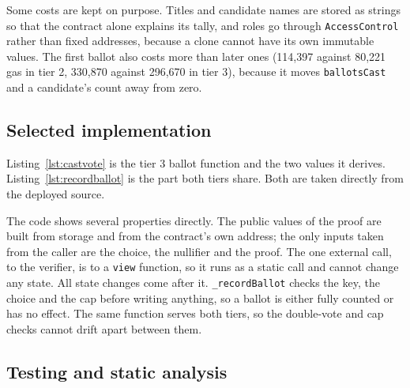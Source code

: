 Some costs are kept on purpose. Titles and candidate names are stored as strings so
that the contract alone explains its tally, and roles go through
\texttt{AccessControl} rather than fixed addresses, because a clone cannot have
its own immutable values. The first ballot also costs more than later ones
(114,397 against 80,221 gas in tier 2, 330,870 against 296,670 in tier 3),
because it moves \texttt{ballotsCast} and a candidate's count away from zero.

\subsection{Selected implementation}

Listing~\ref{lst:castvote} is the tier 3 ballot function and the two values it
derives. Listing~\ref{lst:recordballot} is the part both tiers share. Both are
taken directly from the deployed source.





The code shows several properties directly. The public values of the proof
are built from storage and from the contract's own address; the only inputs
taken from the caller are the choice, the nullifier and the proof. The one
external call, to the verifier, is to a \texttt{view} function, so it runs as a
static call and cannot change any state. All state changes come after it.
\texttt{\_recordBallot} checks the key, the choice and the cap before writing
anything, so a ballot is either fully counted or has no effect. The same
function serves both tiers, so the double-vote and cap checks cannot drift
apart between them.

\subsection{Testing and static analysis}\label{sec:contract-tests}

